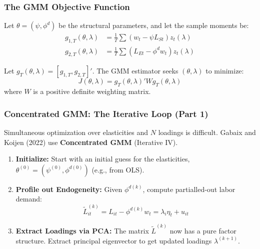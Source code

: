 \documentclass[aspectratio=169,11pt]{beamer}
\begin{document}
\begin{frame}
    \frametitle{The GMM Objective Function}
    
    \vspace{0.5cm}
    Let $\theta = (\psi, \phi^d)$ be the structural parameters, and let the sample moments be:
    \begin{align*}
        g_{1,T}(\theta, \lambda) &= \frac{1}{T} \sum (w_t - \psi L_{St}) z_t(\lambda) \\
        g_{2,T}(\theta, \lambda) &= \frac{1}{T} \sum (L_{Et} - \phi^d w_t) z_t(\lambda)
    \end{align*}
    
    \vspace{0.5cm}
    Let $g_T(\theta, \lambda) = [g_{1,T}, g_{2,T}]'$. The GMM estimator seeks $(\theta, \lambda)$ to minimize:
    \begin{equation*}
        J(\theta, \lambda) = g_T(\theta, \lambda)' W g_T(\theta, \lambda)
    \end{equation*}
    where $W$ is a positive definite weighting matrix.
\end{frame}

\begin{frame}[shrink=10]
    \frametitle{Concentrated GMM: The Iterative Loop (Part 1)}
    
    \vspace{0.3cm}
    Simultaneous optimization over elasticities and $N$ loadings is difficult. Gabaix and Koijen (2022) use \textbf{Concentrated GMM} (Iterative IV).
    
    \vspace{0.5cm}
    \begin{enumerate}
        \item \textbf{Initialize:} Start with an initial guess for the elasticities, $\theta^{(0)} = (\psi^{(0)}, \phi^{d(0)})$ (e.g., from OLS).
        
        \vspace{0.3cm}
        \item \textbf{Profile out Endogeneity:} Given $\phi^{d(k)}$, compute partialled-out labor demand:
        \begin{equation*}
            \tilde{L}_{it}^{(k)} = L_{it} - \phi^{d(k)} w_t = \lambda_i \eta_t + u_{it}
        \end{equation*}
        
        \vspace{0.3cm}
        \item \textbf{Extract Loadings via PCA:} The matrix $\tilde{L}^{(k)}$ now has a pure factor structure. Extract principal eigenvector to get updated loadings $\lambda^{(k+1)}$.
    \end{enumerate}
\end{frame}
\end{document}
